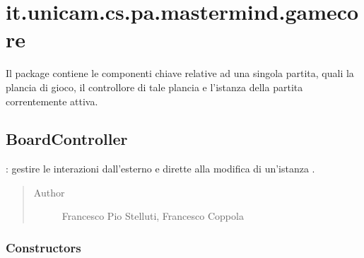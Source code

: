 \documentclass[letterpaper,10pt,italian,openany,oneside]{sphinxmanual}
\begin{document}
\section{it.unicam.cs.pa.mastermind.gamecore}
\label{\detokenize{source/it/unicam/cs/pa/mastermind/gamecore/package-index:it-unicam-cs-pa-mastermind-gamecore}}\label{\detokenize{source/it/unicam/cs/pa/mastermind/gamecore/package-index::doc}}
Il package contiene le componenti chiave relative ad una singola partita, quali la plancia di gioco, il controllore di tale plancia e l’istanza della partita correntemente attiva.

\label{\detokenize{source/it/unicam/cs/pa/mastermind/gamecore/package-index:package-it.unicam.cs.pa.mastermind.gamecore}}

\subsection{BoardController}
\label{\detokenize{source/it/unicam/cs/pa/mastermind/gamecore/BoardController:boardcontroller}}\label{\detokenize{source/it/unicam/cs/pa/mastermind/gamecore/BoardController::doc}}

\begin{fulllineitems}
\label{\detokenize{source/it/unicam/cs/pa/mastermind/gamecore/BoardController:it.unicam.cs.pa.mastermind.gamecore.BoardController}}
: gestire le interazioni dall’esterno e dirette alla modifica di un’istanza .
\begin{quote}\begin{description}
\item[{Author}] \leavevmode
Francesco Pio Stelluti, Francesco Coppola

\end{description}\end{quote}

\end{fulllineitems}



\subsubsection{Constructors}
\label{\detokenize{source/it/unicam/cs/pa/mastermind/gamecore/BoardController:constructors}}
\end{document}
